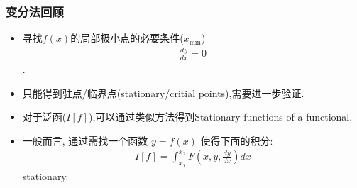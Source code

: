 \documentclass[UTF8, aspectratio=169, 10pt]{ctexbeamer}
\begin{document}
\begin{frame}
  \frametitle{变分法回顾}
  \begin{itemize}
  \item 寻找$f(x)$的局部极小点的必要条件($x_{\min}$)
    \begin{align}
      \frac{dy}{dx} = 0
    \end{align}.
  \item 只能得到驻点/临界点(stationary/critial points),需要进一步验证.
  \item 对于泛函($I[f]$),可以通过类似方法得到Stationary functions of a functional.
  \item 一般而言, 通过需找一个函数 $y=f(x)$ 使得下面的积分:
    \begin{align}
      I[f] = \int_{x_1}^{x_2} F( x, y, \frac{dy}{dx} ) dx
    \end{align}
    stationary.
  \end{itemize}
\end{frame}
\end{document}
